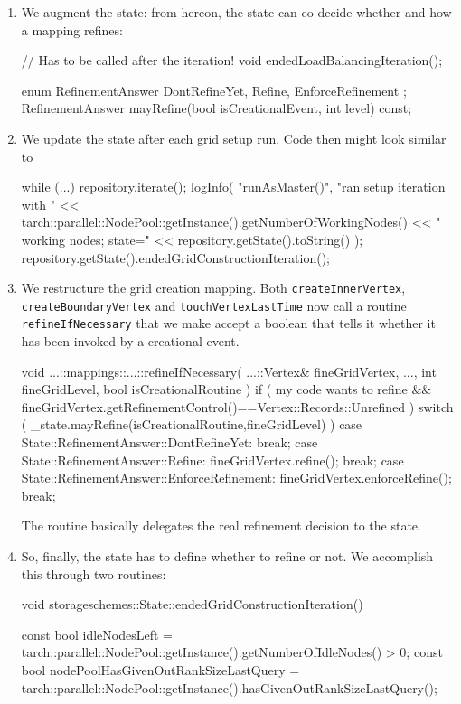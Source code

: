 \begin{enumerate}
  \item We augment the state: from hereon, the state can co-decide whether and
    how a mapping refines:
    \begin{code}
    // Has to be called after the iteration!
    void endedLoadBalancingIteration();

    enum RefinementAnswer {
      DontRefineYet,
      Refine,
      EnforceRefinement
    };
    RefinementAnswer mayRefine(bool isCreationalEvent, int level) const;
    \end{code}


  \item We update the state after each grid setup run. Code then might
  look similar to
    \begin{code}
  while (...) {
    repository.iterate();
    logInfo(
      "runAsMaster()",
      "ran setup iteration with " <<
      tarch::parallel::NodePool::getInstance().getNumberOfWorkingNodes()
      << " working nodes; state=" << repository.getState().toString()
    );
    repository.getState().endedGridConstructionIteration();
  }
    \end{code}

  \item We restructure the grid creation mapping. Both
    \texttt{createInnerVertex}, \texttt{createBoundaryVertex} and
    \texttt{touchVertexLastTime} now call a routine \texttt{refineIfNecessary}
    that we make accept a boolean that tells it whether it has been invoked by a
    creational event.
    \begin{code}
void ...::mappings::...::refineIfNecessary(
  ...::Vertex&  fineGridVertex,
  ...,
  int           fineGridLevel,
  bool          isCreationalRoutine
) {
  if (
    my code wants to refine
    &&
    fineGridVertex.getRefinementControl()==Vertex::Records::Unrefined
  ) {
    switch ( _state.mayRefine(isCreationalRoutine,fineGridLevel) ) {
      case State::RefinementAnswer::DontRefineYet:
        break;
      case State::RefinementAnswer::Refine:
        fineGridVertex.refine();
        break;
      case State::RefinementAnswer::EnforceRefinement:
        fineGridVertex.enforceRefine();
        break;
    }
  }
}
    \end{code} 
    The routine basically delegates the real refinement decision to the state. 
  \item So, finally, the state has to define whether to refine or not. We
  accomplish this through two routines:
  \begin{code}
void storageschemes::State::endedGridConstructionIteration() {
  const bool idleNodesLeft = 
    tarch::parallel::NodePool::getInstance().getNumberOfIdleNodes() > 0;
  const bool nodePoolHasGivenOutRankSizeLastQuery = 
    tarch::parallel::NodePool::getInstance().hasGivenOutRankSizeLastQuery();

}
\end{code}
\end{enumerate}
